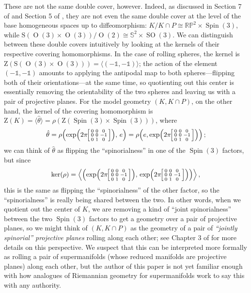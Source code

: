 \documentclass[12pt,a4paper]{amsart}
\theoremstyle{definition}
\DeclareMathOperator{\Orth}{O}
\DeclareMathOperator{\SOrth}{SO}
\DeclareMathOperator{\Spin}{Spin}
\newenvironment{smallbmatrix}
  {\left[\begin{smallmatrix}}
  {\end{smallmatrix}\right]}
\begin{document}
These are not the same double cover, however. Indeed, as discussed in Section 7 of \cite{BorMontgomery2009} and Section 5 of \cite{BaezHuerta2014}, they are not even the same double cover at the level of the base homogeneous spaces up to diffeomorphism: $K/K\cap P\cong\mathbb{RP}^2\times\Spin(3)$, while $\mathrm{S}(\Orth(3)\times\Orth(3))/\Orth(2)\cong\mathbb{S}^2\times\SOrth(3)$. We can distinguish between these double covers intuitively by looking at the kernels of their respective covering homomorphisms. In the case of rolling spheres, the kernel is $\mathrm{Z}(\mathrm{S}(\Orth(3)\times\Orth(3)))=\langle(-\mathds{1},-\mathds{1})\rangle$; the action of the element $(-\mathds{1},-\mathds{1})$ amounts to applying the antipodal map to both spheres---flipping both of their orientations---at the same time, so quotienting out this center is essentially removing the orientability of the two spheres and leaving us with a pair of projective planes. For the model geometry $(K,K\cap P)$, on the other hand, the kernel of the covering homomorphism is $\mathrm{Z}(K)=\langle\hat{\theta}\rangle=\rho(\mathrm{Z}(\Spin(3)\times\Spin(3)))$, where
\[\hat{\theta}=\rho\!\left(\exp\!\left(2\pi\!\begin{smallbmatrix}0 & 0 & 0 \\ 0 & 0 & -1 \\ 0 & 1 & 0\end{smallbmatrix}\right)\!,\,e\right)=\rho\!\left(e,\exp\!\left(2\pi\!\begin{smallbmatrix}0 & 0 & 0 \\ 0 & 0 & -1 \\ 0 & 1 & 0\end{smallbmatrix}\right)\right);\]
we can think of $\hat{\theta}$ as flipping the ``spinorialness'' in one of the $\Spin(3)$ factors, but since
\[\ker(\rho)=\left\langle\left(\exp\!\left(2\pi\!\begin{smallbmatrix}0 & 0 & 0 \\ 0 & 0 & -1 \\ 0 & 1 & 0\end{smallbmatrix}\right)\!,\,\exp\!\left(2\pi\!\begin{smallbmatrix}0 & 0 & 0 \\ 0 & 0 & -1 \\ 0 & 1 & 0\end{smallbmatrix}\right)\right)\right\rangle,\]
this is the same as flipping the ``spinorialness'' of the other factor, so the ``spinorialness'' is really being shared between the two. In other words, when we quotient out the center of $K$, we are removing a kind of ``joint spinorialness'' between the two $\Spin(3)$ factors to get a geometry over a pair of projective planes, so we might think of ${(K,K\cap P)}$ as the geometry of a pair of \emph{``jointly spinorial'' projective planes} rolling along each other; see Chapter 3 of \cite{EricksonThesis} for more details on this perspective. We suspect that this can be interpreted more formally as rolling a pair of supermanifolds (whose reduced manifolds are projective planes) along each other, but the author of this paper is not yet familiar enough with how analogues of Riemannian geometry for supermanifolds work to say this with any authority.
\end{document}
